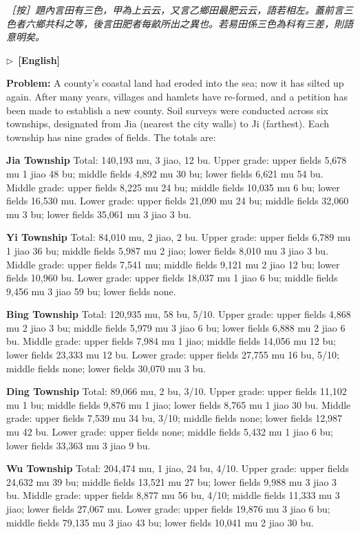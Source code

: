 \documentclass[10pt,a4paper]{article}
\newcommand{\ENmarker}{\noindent\textcolor{enlabel}{$\triangleright$\ \textbf{[English]}}\par}
\newcommand{\EditorialNote}[1]{\par\noindent\textit{［按］#1}\par}
\newcommand{\QuestionEn}[1]{\par\noindent\textbf{\color{problemcolor}Problem:} #1\par}
\begin{document}
\EditorialNote{題內言田有三色，甲為上云云，又言乙鄉田最肥云云，語若相左。蓋前言三色者六鄉共科之等，後言田肥者每畝所出之異也。若易田係三色為科有三差，則語意明矣。}

\ENmarker
\QuestionEn{A county's coastal land had eroded into the sea; now it has silted up again. After many years, villages and hamlets have re-formed, and a petition has been made to establish a new county. Soil surveys were conducted across six townships, designated from Jia (nearest the city walls) to Ji (farthest). Each township has nine grades of fields. The totals are:

\textbf{Jia Township} Total: 140,193 mu, 3 jiao, 12 bu. Upper grade: upper fields 5,678 mu 1 jiao 48 bu; middle fields 4,892 mu 30 bu; lower fields 6,621 mu 54 bu. Middle grade: upper fields 8,225 mu 24 bu; middle fields 10,035 mu 6 bu; lower fields 16,530 mu. Lower grade: upper fields 21,090 mu 24 bu; middle fields 32,060 mu 3 bu; lower fields 35,061 mu 3 jiao 3 bu.

\textbf{Yi Township} Total: 84,010 mu, 2 jiao, 2 bu. Upper grade: upper fields 6,789 mu 1 jiao 36 bu; middle fields 5,987 mu 2 jiao; lower fields 8,010 mu 3 jiao 3 bu. Middle grade: upper fields 7,541 mu; middle fields 9,121 mu 2 jiao 12 bu; lower fields 10,960 bu. Lower grade: upper fields 18,037 mu 1 jiao 6 bu; middle fields 9,456 mu 3 jiao 59 bu; lower fields none.

\textbf{Bing Township} Total: 120,935 mu, 58 bu, 5/10. Upper grade: upper fields 4,868 mu 2 jiao 3 bu; middle fields 5,979 mu 3 jiao 6 bu; lower fields 6,888 mu 2 jiao 6 bu. Middle grade: upper fields 7,984 mu 1 jiao; middle fields 14,056 mu 12 bu; lower fields 23,333 mu 12 bu. Lower grade: upper fields 27,755 mu 16 bu, 5/10; middle fields none; lower fields 30,070 mu 3 bu.

\textbf{Ding Township} Total: 89,066 mu, 2 bu, 3/10. Upper grade: upper fields 11,102 mu 1 bu; middle fields 9,876 mu 1 jiao; lower fields 8,765 mu 1 jiao 30 bu. Middle grade: upper fields 7,539 mu 34 bu, 3/10; middle fields none; lower fields 12,987 mu 42 bu. Lower grade: upper fields none; middle fields 5,432 mu 1 jiao 6 bu; lower fields 33,363 mu 3 jiao 9 bu.

\textbf{Wu Township} Total: 204,474 mu, 1 jiao, 24 bu, 4/10. Upper grade: upper fields 24,632 mu 39 bu; middle fields 13,521 mu 27 bu; lower fields 9,988 mu 3 jiao 3 bu. Middle grade: upper fields 8,877 mu 56 bu, 4/10; middle fields 11,333 mu 3 jiao; lower fields 27,067 mu. Lower grade: upper fields 19,876 mu 3 jiao 6 bu; middle fields 79,135 mu 3 jiao 43 bu; lower fields 10,041 mu 2 jiao 30 bu.

}
\end{document}
